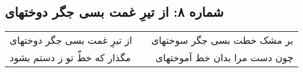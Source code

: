 \begin{center}
\section*{شماره ۸: از تیرِ غمت بسی جگر دوختهای}
\label{sec:008}
\begin{longtable}{l p{0.5cm} r}
از تیرِ غمت بسی جگر دوختهای
&&
بر مشک خطت بسی جگر سوختهای
\\
مگذار که خطّ تو ز دستم بشود
&&
چون دست مرا بدان خط آموختهای
\\
\end{longtable}
\end{center}
